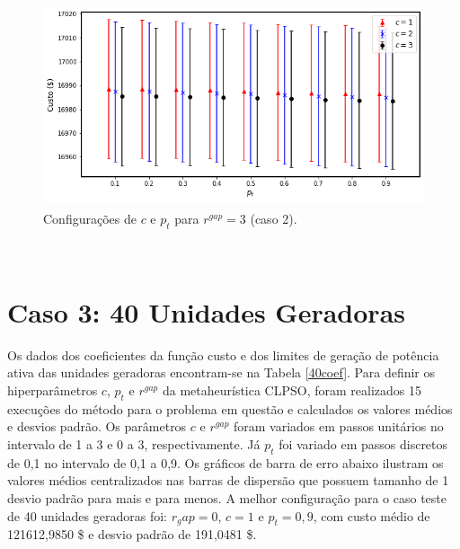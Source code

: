 \documentclass[
	12pt,				%
	openany,			%
	twoside,			%
	a4paper,			%
	chapter=TITLE,		%
	section=Title,		%
	subsection=Title,	%
	subsubsection=Title,%
	english,			%
	french,				%
	spanish,			%
	brazil			%
	]{abntex2}
\begin{document}
\begin{ERRATA}
\begin{apendicesenv}
\begin{figure}[h!]
\end{figure}

\begin{figure}[h!]
    \caption{\label{rgap3_19}Configurações de $c$ e $p_t$ para $r^{gap}=3$ (caso 2).}
    \centering
    \includegraphics[width=120mm, height=60mm]{images/rgap3_19.png}
\end{figure}


\pagebreak
\\

\section{Caso 3: 40 Unidades Geradoras}

Os dados dos coeficientes da função custo e dos limites de geração de potência ativa das unidades geradoras encontram-se na Tabela \ref{40coef}. Para definir os hiperparâmetros $c$, $p_t$ e $r^{gap}$ da metaheurística CLPSO, foram realizados 15 execuções do método para o problema em questão e calculados os valores médios e desvios padrão. Os parâmetros $c$ e $r^{gap}$ foram variados em passos unitários no intervalo de 1 a 3 e 0 a 3, respectivamente. Já $p_t$ foi variado em passos discretos de 0,1 no intervalo de 0,1 a 0,9. Os gráficos de barra de erro abaixo ilustram os valores médios centralizados nas barras de dispersão que possuem tamanho de 1 desvio padrão para mais e para menos. A melhor configuração para o caso teste de 40 unidades geradoras foi: $r_gap=0$, $c=1$ e $p_t=0,9$, com custo médio de 121612,9850 \$ e desvio padrão de 191,0481 \$.



\end{apendicesenv}
\end{ERRATA}
\end{document}
